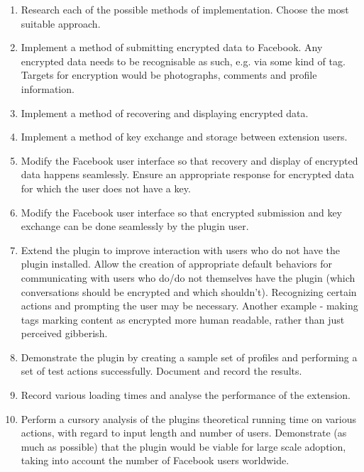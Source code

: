 \documentclass[12pt]{article}
\begin{document}
\begin{enumerate}

\item Research each of the possible methods of implementation. Choose the most suitable approach.

\item Implement a method of submitting encrypted data to Facebook. Any encrypted data needs to be recognisable as such, e.g. via some kind of tag. Targets for encryption would be photographs, comments and profile information.

\item Implement a method of recovering and displaying encrypted data.

\item Implement a method of key exchange and storage between extension users.

\item Modify the Facebook user interface so that recovery and display of encrypted data happens seamlessly. Ensure an appropriate response for encrypted data for which the user does not have a key.

\item Modify the Facebook user interface so that encrypted submission and key exchange can be done seamlessly by the plugin user.

\item Extend the plugin to improve interaction with users who do not have the plugin installed. Allow the creation of appropriate default behaviors for communicating with users who do/do not themselves have the plugin (which conversations should be encrypted and which shouldn't). Recognizing certain actions and prompting the user may be necessary. Another example - making tags marking content as encrypted more human readable, rather than just perceived gibberish.

\item Demonstrate the plugin by creating a sample set of profiles and performing a set of test actions successfully. Document and record the results.

\item Record various loading times and analyse the performance of the extension.

\item Perform a cursory analysis of the plugins theoretical running time on various actions, with regard to input length and number of users. Demonstrate (as much as possible) that the plugin would be viable for large scale adoption, taking into account the number of Facebook users worldwide.


\end{enumerate}
\end{document}
